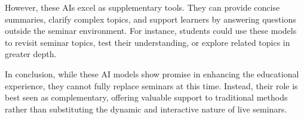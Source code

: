 However, these AIs excel as supplementary tools. They can provide concise summaries, clarify complex topics, and support
learners by answering questions outside the seminar environment. For instance, students could use these models to revisit
seminar topics, test their understanding, or explore related topics in greater depth.

In conclusion, while these AI models show promise in enhancing the educational experience, they cannot fully
replace seminars at this time. Instead, their role is best seen as complementary, offering valuable support to traditional
methods rather than substituting the dynamic and interactive nature of live seminars.
